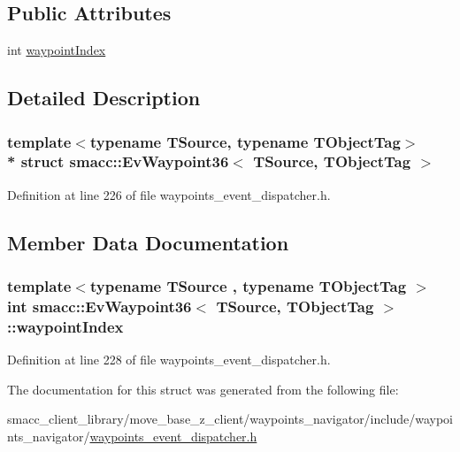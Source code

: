 \subsection*{Public Attributes}
\begin{DoxyCompactItemize}
\item 
int \hyperlink{structsmacc_1_1EvWaypoint36_ac09b75e02e4ff1dfaa9eca83228de5a3}{waypoint\+Index}
\end{DoxyCompactItemize}


\subsection{Detailed Description}
\subsubsection*{template$<$typename T\+Source, typename T\+Object\+Tag$>$\\*
struct smacc\+::\+Ev\+Waypoint36$<$ T\+Source, T\+Object\+Tag $>$}



Definition at line 226 of file waypoints\+\_\+event\+\_\+dispatcher.\+h.



\subsection{Member Data Documentation}
\subsubsection[{\texorpdfstring{waypoint\+Index}{waypointIndex}}]{\setlength{\rightskip}{0pt plus 5cm}template$<$typename T\+Source , typename T\+Object\+Tag $>$ int {\bf smacc\+::\+Ev\+Waypoint36}$<$ T\+Source, T\+Object\+Tag $>$\+::waypoint\+Index}\hypertarget{structsmacc_1_1EvWaypoint36_ac09b75e02e4ff1dfaa9eca83228de5a3}{}\label{structsmacc_1_1EvWaypoint36_ac09b75e02e4ff1dfaa9eca83228de5a3}


Definition at line 228 of file waypoints\+\_\+event\+\_\+dispatcher.\+h.



The documentation for this struct was generated from the following file\+:\begin{DoxyCompactItemize}
\item 
smacc\+\_\+client\+\_\+library/move\+\_\+base\+\_\+z\+\_\+client/waypoints\+\_\+navigator/include/waypoints\+\_\+navigator/\hyperlink{waypoints__event__dispatcher_8h}{waypoints\+\_\+event\+\_\+dispatcher.\+h}\end{DoxyCompactItemize}
